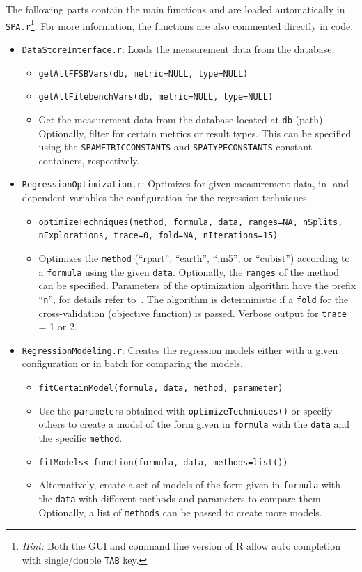 The following parts contain the main functions and are loaded automatically in \texttt{SPA.r}\footnote{\textit{Hint:} Both the GUI and command line version of R allow auto completion with single/double \texttt{TAB} key.}. For more information, the functions are also commented directly in code.
\begin{itemize}
  \item \texttt{DataStoreInterface.r}: Loads the measurement data from the database.
  \begin{itemize}
    \item \texttt{getAllFFSBVars(db, metric=NULL, type=NULL)}
    \item \texttt{getAllFilebenchVars(db, metric=NULL, type=NULL)}
    \item[] Get the measurement data from the database located at \texttt{db} (path). Optionally, filter for certain metrics or result types. This can be specified using the \texttt{SPAMETRICCONSTANTS} and \texttt{SPATYPECONSTANTS} constant containers, respectively.
  \end{itemize}
  \item \texttt{RegressionOptimization.r}: Optimizes for given measurement data, in- and dependent variables the configuration for the regression techniques. 
  \begin{itemize}
    \item \texttt{optimizeTechniques(method, formula, data, ranges=NA, nSplits,} \texttt{nExplorations, trace=0, fold=NA, nIterations=15)} 
    \item[] Optimizes the \texttt{method} (``rpart'', ``earth'', ``,m5'', or ``cubist'') according to a \texttt{formula} using the given \texttt{data}. Optionally, the \texttt{ranges} of the method can be specified. Parameters of the optimization algorithm have the prefix ``\texttt{n}'', for details refer to~\cite{noorshams2013a}. The algorithm is deterministic if a \texttt{fold} for the cross-validation (objective function) is passed. Verbose output for \texttt{trace} = 1 or 2.
  \end{itemize}
  \item \texttt{RegressionModeling.r}: Creates the regression models either with a given configuration or in batch for comparing the models.
  \begin{itemize}
    \item \texttt{fitCertainModel(formula, data, method, parameter)}
    \item[] Use the \texttt{parameter}s obtained with \texttt{optimizeTechniques()} or specify others to create a model of the form given in \texttt{formula} with the \texttt{data} and the specific \texttt{method}.
    \item \texttt{fitModels<-function(formula, data, methods=list())}
    \item[] Alternatively, create a set of models of the form given in \texttt{formula} with the \texttt{data} with different methods and parameters to compare them. Optionally, a list of \texttt{methods} can be passed to create more models.
  \end{itemize}
\end{itemize}

